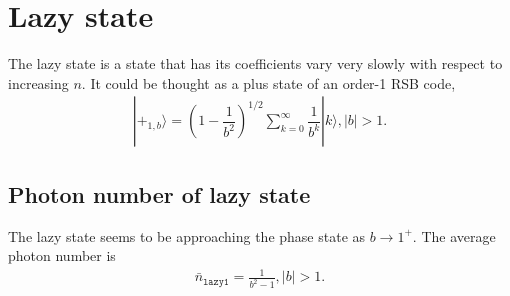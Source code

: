\documentclass{article}
\begin{document}
\section{Lazy state}
The lazy state is a state that has its coefficients vary very slowly with respect to increasing $n$. It could be thought as a plus state of an order-1 RSB code,
\begin{align}
    |+_{1,b}\rangle= \left(1-\dfrac{1}{b^2}\right)^{1/2}\sum_{k=0}^\infty \dfrac{1}{b^k}|k\rangle, |b|>1.
\end{align}
\subsection{Photon number of lazy state}
The lazy state seems to be approaching the phase state as $b\to 1^+$. The average photon number is 
\begin{align}
    \bar{n}_\texttt{lazy1}=\frac{1}{b^2-1}, |b| > 1. 
\end{align}


\end{document}
